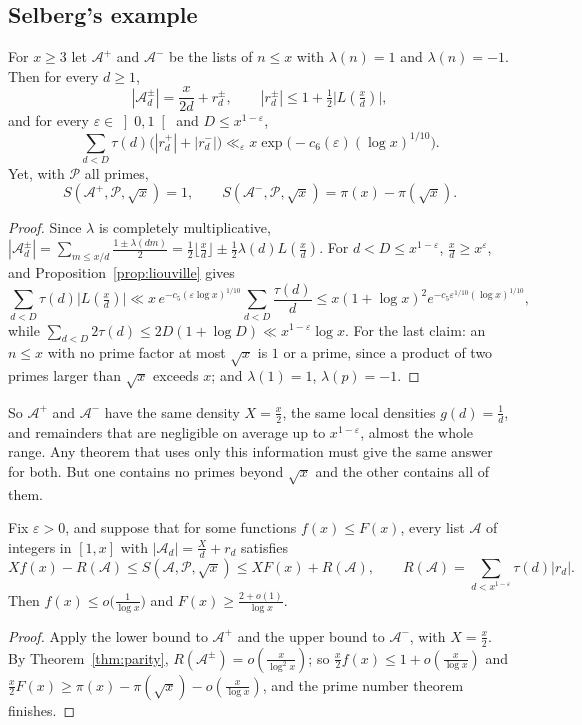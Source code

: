\subsection*{Selberg's example}

\begin{theorem}\label{thm:parity}
For $x\ge3$ let $\mathcal A^+$ and $\mathcal A^-$ be the lists of $n\le x$ with $\lambda(n)=1$ and $\lambda(n)=-1$. Then for every $d\ge1$,
\[
|\mathcal A^\pm_d|=\frac x{2d}+r^\pm_d,\qquad|r^\pm_d|\le1+\tfrac12\bigl|L(\tfrac xd)\bigr|,
\]
and for every $\varepsilon\in\left]0,1\right[$ and $D\le x^{1-\varepsilon}$,
\[
\sum_{d<D}\tau(d)\bigl(|r^+_d|+|r^-_d|\bigr)\ll_\varepsilon x\exp\bigl(-c_6(\varepsilon)(\log x)^{1/10}\bigr).
\]
Yet, with $\mathcal P$ all primes,
\[
S(\mathcal A^+,\mathcal P,\sqrt x)=1,\qquad S(\mathcal A^-,\mathcal P,\sqrt x)=\pi(x)-\pi(\sqrt x).
\]
\end{theorem}
\begin{proof}
Since $\lambda$ is completely multiplicative, $|\mathcal A^\pm_d|=\sum_{m\le x/d}\frac{1\pm\lambda(dm)}2=\frac12\lfloor\frac xd\rfloor\pm\frac12\lambda(d)L(\frac xd)$. For $d<D\le x^{1-\varepsilon}$, $\frac xd\ge x^\varepsilon$, and Proposition~\ref{prop:liouville} gives
\[
\sum_{d<D}\tau(d)\bigl|L(\tfrac xd)\bigr|\ll x\,e^{-c_5(\varepsilon\log x)^{1/10}}\sum_{d<D}\frac{\tau(d)}d\le x(1+\log x)^2e^{-c_5\varepsilon^{1/10}(\log x)^{1/10}},
\]
while $\sum_{d<D}2\tau(d)\le2D(1+\log D)\ll x^{1-\varepsilon}\log x$. For the last claim: an $n\le x$ with no prime factor at most $\sqrt x$ is $1$ or a prime, since a product of two primes larger than $\sqrt x$ exceeds $x$; and $\lambda(1)=1$, $\lambda(p)=-1$.
\end{proof}

So $\mathcal A^+$ and $\mathcal A^-$ have the same density $X=\frac x2$, the same local densities $g(d)=\frac1d$, and remainders that are negligible on average up to $x^{1-\varepsilon}$, almost the whole range. Any theorem that uses only this information must give the same answer for both. But one contains no primes beyond $\sqrt x$ and the other contains all of them.

\begin{corollary}\label{cor:parity}
Fix $\varepsilon>0$, and suppose that for some functions $f(x)\le F(x)$, every list $\mathcal A$ of integers in $[1,x]$ with $|\mathcal A_d|=\frac Xd+r_d$ satisfies
\[
Xf(x)-R(\mathcal A)\le S(\mathcal A,\mathcal P,\sqrt x)\le XF(x)+R(\mathcal A),\qquad R(\mathcal A)=\sum_{d<x^{1-\varepsilon}}\tau(d)|r_d|.
\]
Then $f(x)\le o\bigl(\frac1{\log x}\bigr)$ and $F(x)\ge\frac{2+o(1)}{\log x}$.
\end{corollary}
\begin{proof}
Apply the lower bound to $\mathcal A^+$ and the upper bound to $\mathcal A^-$, with $X=\frac x2$. By Theorem~\ref{thm:parity}, $R(\mathcal A^\pm)=o(\frac x{\log^2x})$; so $\frac x2f(x)\le1+o(\frac x{\log x})$ and $\frac x2F(x)\ge\pi(x)-\pi(\sqrt x)-o(\frac x{\log x})$, and the prime number theorem finishes.
\end{proof}

